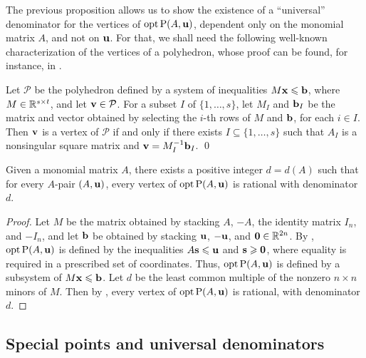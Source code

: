 \documentclass[11pt]{amsart}
\newcommand{\denom}{d}
\begin{document}
The previous proposition allows us to show the existence of a ``universal'' denominator for the vertices
of $\operatorname{opt}\mathrm{P}(A,\mathbf{u})$, dependent only on the monomial matrix $A$, and not on $\mathbf{u}$.
For that, we shall need the following well-known characterization of the vertices of a polyhedron, whose proof can be found, for instance, in \cite[Theorem~3.34]{conforti+etal.integer_programming}.

\begin{lemma}
   \label{prop: characterization of vertices}
   Let $\mathcal{P}$ be the polyhedron defined by a system of inequalities $M \mathbf{x} \leqslant \mathbf{b}$, where $M\in \mathbb{R}^{s\times t}$, and let $\mathbf{v} \in \mathcal{P}$.
   For a subset $I$ of $\{1,\ldots,s\}$, let $M_I$ and $\mathbf{b}_I$ be the matrix and vector obtained by selecting the $i$-th rows of $M$ and $\mathbf{b}$, for each $i\in I$.
   Then $\mathbf{v}$ is a vertex of $\mathcal{P}$ if and only if there exists $I \subseteq \{1,\ldots,s\}$ such that $A_I$ is a nonsingular square matrix and $\mathbf{v} = M_I^{-1}\mathbf{b}_I$.
\qed
\end{lemma}

\begin{theorem}
\label{uniform denominators for vertices:  T}
Given a monomial matrix $A$, there exists a positive integer $\denom = \denom(A)$ such that for every $A$-pair $(A, \mathbf{u})$, every vertex of $\operatorname{opt} \mathrm{P}(A, \mathbf{u})$ is rational with denominator $\denom$.
\end{theorem}

\begin{proof}
   Let $M$ be the matrix obtained by stacking $A$, $-A$, the identity matrix $I_n$, and $-I_n$, and let $\mathbf{b}$ be obtained by stacking $\mathbf{u}$, $-\mathbf{u}$, and $\mathbf{0}\in \mathbb{R}^{2n}$.
   By , $\operatorname{opt} \mathrm{P}(A,\mathbf{u})$ is defined by the inequalities $A\mathbf{s} \leqslant \mathbf{u}$ and $\mathbf{s}\geqslant \mathbf{0}$, where equality is required in a prescribed set of coordinates.
   Thus, $\operatorname{opt} \mathrm{P}(A,\mathbf{u})$ is defined by a subsystem of $M \mathbf{x} \leqslant \mathbf{b}$.
   Let $\denom$ be the least common multiple of the nonzero $n\times n$ minors of $M$.
   Then by , every vertex of $\operatorname{opt} \mathrm{P}(A,\mathbf{u})$ is rational, with denominator $\denom$.
\end{proof}

\subsection{Special points and universal denominators}
\end{document}
